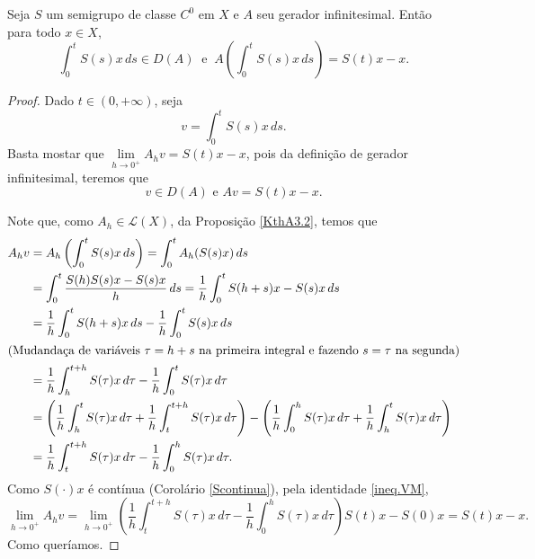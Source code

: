\begin{proposition}\label{prop2.11}
Seja $S$ um semigrupo de classe $C^0$ em $X$ e $A$ seu gerador infinitesimal. Então para todo $x\in X$, 
\[\int_0^tS(s)x\,ds\in D(A)\ \text{ e }\ A\left(\int_0^t S(s)x\,ds\right)=S(t)x-x.\]
\end{proposition}
\begin{proof}
   Dado $t\in (0,+\infty)$, seja 
\begin{equation*}
v=\int_0^t S(s)x\, ds.
\end{equation*}
Basta mostar que $\lim\limits_{h\to 0^+} A_hv=S(t)x-x$, pois da definição de gerador infinitesimal, teremos que
\[v\in D(A) \text{ e } Av=S(t)x-x.\]

Note que, como $A_h \in \mathcal{L}(X)$, da Proposição \ref{KthA3.2}, temos que
\begin{align*}
A_hv& =A_h\left(\int_0^t S(s)x\,ds\right)=\int_0^t A_h(S(s)x)\,ds\\
& =\int_0^t \frac{S(h)S(s)x-S(s)x}{h}\,ds
= \frac{1}{h}\int_0^t S(h+s)x-S(s)x\,ds\\
&= \frac{1}{h}\int_0^t S(h+s)x\,ds- \frac{1}{h}\int_0^t S(s)x\,ds\\
\shortintertext{(Mudandaça de variáveis $\tau=h+s$ na primeira integral e fazendo $s=\tau$ na segunda)}
&=\frac{1}{h}\int_h^{t+h} S(\tau)x\,d\tau- \frac{1}{h}\int_0^t S(\tau)x\,d\tau\\
&=\left(\frac{1}{h}\int_h^{t} S(\tau)x\,d\tau+\frac{1}{h}\int_t^{t+h} S(\tau)x\,d\tau\right) -
 \left(\frac{1}{h}\int_0^h S(\tau)x\,d\tau+\frac{1}{h}\int_h^t S(\tau)x\,d\tau\right)\\
&=\frac{1}{h}\int_t^{t+h} S(\tau)x\,d\tau-\frac{1}{h}\int_0^h S(\tau)x\,d\tau.
\end{align*}
Como $S(\cdot)x$ é contínua (Corolário \ref{Scontinua}), pela identidade \eqref{ineq.VM}, 
\begin{equation*}
\lim\limits_{h\to 0^+} A_hv =\lim\limits_{h\to 0^+} \left(\frac{1}{h}\int_t^{t+h} S(\tau)x\,d\tau-\frac{1}{h}\int_0^h S(\tau)x\,d\tau\right) S(t)x-S(0)x=S(t)x-x.
\end{equation*}
Como queríamos.
\end{proof}

